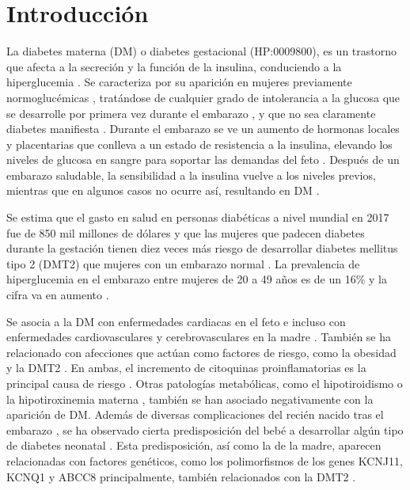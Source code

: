 \section{Introducción}

La diabetes materna (DM) o diabetes gestacional (HP:0009800), es un trastorno que afecta a la secreción y la función de la insulina, conduciendo a la hiperglucemia \cite{Rodolaki2023}. Se caracteriza por su aparición en mujeres previamente normoglucémicas \cite{Rodolaki2023}, tratándose de cualquier grado de intolerancia a la glucosa que se desarrolle por primera vez durante el embarazo \cite{ADB2009}, y que no sea claramente diabetes manifiesta \cite{Grazia2020}. Durante el embarazo se ve un aumento de hormonas locales y placentarias que conlleva a un estado de resistencia a la insulina, elevando los niveles de glucosa en sangre para soportar las demandas del feto \cite{Plows2018}. Después de un embarazo saludable, la sensibilidad a la insulina vuelve a los niveles previos, mientras que en algunos casos no ocurre así, resultando en DM \cite{Plows2018}.


Se estima que el gasto en salud en personas diabéticas a nivel mundial en 2017 fue de 850 mil millones de dólares \cite{Cho2018} y que las mujeres que padecen diabetes durante la gestación tienen diez veces más riesgo de desarrollar diabetes mellitus tipo 2 (DMT2) que mujeres con un embarazo normal \cite{Vounzoulaki2020, You2021}. La prevalencia de hiperglucemia en el embarazo entre mujeres de 20 a 49 años es de un 16\% y la cifra va en aumento \cite{Guariguata2014}.

Se asocia a la DM con enfermedades cardiacas en el feto \cite{Depla2021} e incluso con enfermedades cardiovasculares y cerebrovasculares en la madre \cite{Xie2022}. También se ha relacionado con afecciones que actúan como factores de riesgo, como la obesidad \cite{Shah2011} y la DMT2 \cite{Haroush2004}. En ambas, el incremento de citoquinas proinflamatorias es la principal causa de riesgo \cite{Pantham2015}. Otras patologías metabólicas, como el hipotiroidismo \cite{Gong2016} o la hipotiroxinemia materna \cite{Topaloglu2022}, también se han asociado negativamente con la aparición de DM.
Además de diversas complicaciones del recién nacido tras el embarazo \cite{Depla2021, Metzger2010}, se ha observado cierta predisposición del bebé a desarrollar algún tipo de diabetes neonatal \cite{Dabelea2000}. Esta predisposición, así como la de la madre, aparecen relacionadas con factores genéticos, como los polimorfismos de los genes KCNJ11, KCNQ1 \cite{Ao2015} y ABCC8 \cite{Piccini2018} principalmente, también relacionados con la DMT2 \cite{Khan2020}.


